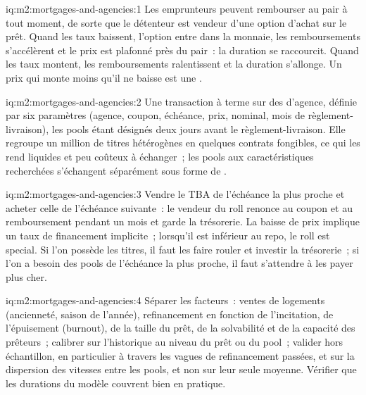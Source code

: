\begin{solution}{iq:m2:mortgages-and-agencies:1}
Les emprunteurs peuvent rembourser au pair à tout moment, de sorte que le détenteur est
vendeur d'une option d'achat sur le prêt. Quand les taux baissent, l'option entre dans la monnaie, les remboursements
s'accélèrent et le prix est plafonné près du pair~: la duration se raccourcit. Quand les taux
montent, les remboursements ralentissent et la duration s'allonge. Un prix qui monte moins
qu'il ne baisse est une .
\end{solution}

\begin{solution}{iq:m2:mortgages-and-agencies:2}
Une transaction à terme sur des  d'agence, définie par six paramètres (agence, coupon,
échéance, prix, nominal, mois de règlement-livraison), les pools étant désignés deux jours avant
le règlement-livraison. Elle regroupe un million de titres hétérogènes en quelques
contrats fongibles, ce qui les rend liquides et peu coûteux à échanger~; les pools aux
caractéristiques recherchées s'échangent séparément sous forme de .
\end{solution}

\begin{solution}{iq:m2:mortgages-and-agencies:3}
Vendre le TBA de l'échéance la plus proche et acheter celle de l'échéance suivante~: le
vendeur du roll renonce au coupon et au remboursement pendant un mois et garde la trésorerie. La baisse de prix implique un
taux de financement implicite~; lorsqu'il est inférieur au repo, le roll est special. Si l'on possède les titres,
il faut les faire rouler et investir la trésorerie~; si l'on a besoin des pools de
l'échéance la plus proche, il faut s'attendre à les payer plus cher.
\end{solution}

\begin{solution}{iq:m2:mortgages-and-agencies:4}
Séparer les facteurs~: ventes de logements (ancienneté, saison de l'année), refinancement
en fonction de l'incitation, de l'épuisement (burnout), de la taille du prêt, de la solvabilité et de la
capacité des prêteurs~; calibrer sur l'historique au niveau du prêt ou du pool~; valider hors échantillon,
en particulier à travers les vagues de refinancement passées, et sur la dispersion des
vitesses entre les pools, et non sur leur seule moyenne. Vérifier que les durations du modèle couvrent
bien en pratique.
\end{solution}

